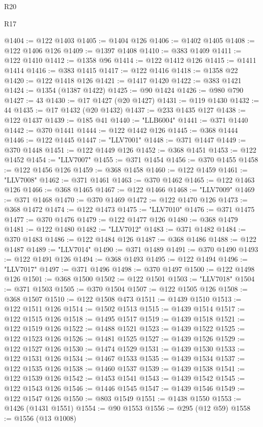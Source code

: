 \begin{lexlean}{R20}
\begin{lexlean}{R17}
\begin{coremodule}
{{{{{{{{{{{{{{{{{{{{{{{{{{{{{{{{{{{{{{{{{{{{{{{{{{{{{{{{{{{{{{{{{{{{{{{{{{{{{{{{{{{{{{{{{{{{{{{{{{{{{{{{{{{@1404 := @122 @1403
@1405 := @1404 @126
@1406 := @1402 @1405
@1408 := @122 @1406 @126
@1409 := @1397 @1408
@1410 := @383 @1409
@1411 := @122 @1410
@1412 := @1358 @96
@1414 := @122 @1412 @126
@1415 := @1411 @1414
@1416 := @383 @1415
@1417 := @122 @1416
@1418 := @1358 @22
@1420 := @122 @1418 @126
@1421 := @1417 @1420
@1422 := @383 @1421
@1424 := @1354 (@1387 @1422)
@1425 := @90 @1424
@1426 := @980 @790
@1427 := 43
@1430 := @17 @1427 (@20 @1427)
@1431 := @119 @1430
@1432 := 44
@1435 := @17 @1432 (@20 @1432)
@1437 := @233 @1435 @127
@1438 := @122 @1437
@1439 := @185 @41
@1440 := "LLB6004"
@1441 := @371 @1440
@1442 := @370 @1441
@1444 := @122 @1442 @126
@1445 := @368 @1444
@1446 := @122 @1445
@1447 := "LLV7001"
@1448 := @371 @1447
@1449 := @370 @1448
@1451 := @122 @1449 @126
@1452 := @368 @1451
@1453 := @122 @1452
@1454 := "LLV7007"
@1455 := @371 @1454
@1456 := @370 @1455
@1458 := @122 @1456 @126
@1459 := @368 @1458
@1460 := @122 @1459
@1461 := "LLV7008"
@1462 := @371 @1461
@1463 := @370 @1462
@1465 := @122 @1463 @126
@1466 := @368 @1465
@1467 := @122 @1466
@1468 := "LLV7009"
@1469 := @371 @1468
@1470 := @370 @1469
@1472 := @122 @1470 @126
@1473 := @368 @1472
@1474 := @122 @1473
@1475 := "LLV7010"
@1476 := @371 @1475
@1477 := @370 @1476
@1479 := @122 @1477 @126
@1480 := @368 @1479
@1481 := @122 @1480
@1482 := "LLV7012"
@1483 := @371 @1482
@1484 := @370 @1483
@1486 := @122 @1484 @126
@1487 := @368 @1486
@1488 := @122 @1487
@1489 := "LLV7014"
@1490 := @371 @1489
@1491 := @370 @1490
@1493 := @122 @1491 @126
@1494 := @368 @1493
@1495 := @122 @1494
@1496 := "LLV7017"
@1497 := @371 @1496
@1498 := @370 @1497
@1500 := @122 @1498 @126
@1501 := @368 @1500
@1502 := @122 @1501
@1503 := "LLV7018"
@1504 := @371 @1503
@1505 := @370 @1504
@1507 := @122 @1505 @126
@1508 := @368 @1507
@1510 := @122 @1508 @473
@1511 := @1439 @1510
@1513 := @122 @1511 @126
@1514 := @1502 @1513
@1515 := @1439 @1514
@1517 := @122 @1515 @126
@1518 := @1495 @1517
@1519 := @1439 @1518
@1521 := @122 @1519 @126
@1522 := @1488 @1521
@1523 := @1439 @1522
@1525 := @122 @1523 @126
@1526 := @1481 @1525
@1527 := @1439 @1526
@1529 := @122 @1527 @126
@1530 := @1474 @1529
@1531 := @1439 @1530
@1533 := @122 @1531 @126
@1534 := @1467 @1533
@1535 := @1439 @1534
@1537 := @122 @1535 @126
@1538 := @1460 @1537
@1539 := @1439 @1538
@1541 := @122 @1539 @126
@1542 := @1453 @1541
@1543 := @1439 @1542
@1545 := @122 @1543 @126
@1546 := @1446 @1545
@1547 := @1439 @1546
@1549 := @122 @1547 @126
@1550 := @803 @1549
@1551 := @1438 @1550
@1553 := @1426 (@1431 @1551)
@1554 := @90 @1553
@1556 := @295 (@12 @59)
@1558 := @1556 (@13 @1008)
}}}}}}}}}}}}}}}}}}}}}}}}}}}}}}}}}}}}}}}}}}}}}}}}}}}}}}}}}}}}}}}}}}}}}}}}}}}}}}}}}}}}}}}}}}}}}}}}}}}}}}}}}}}
\end{coremodule}
\end{lexlean}
\end{lexlean}
